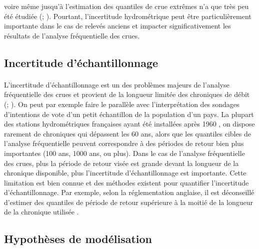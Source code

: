 voire même jusqu'à l'estimation des quantiles de crue extrêmes n'a que très peu été étudiée (\cite{horner_impact_2018}; \cite{steinbakk_propagation_2016}). Pourtant, l'incertitude hydrométrique peut être particulièrement importante dans le cas de relevés anciens et impacter significativement les résultats de l'analyse fréquentielle des crues.
	
	\subsection*{Incertitude d'échantillonnage}
	
	\paragraph{} L'incertitude d'échantillonnage est un des problèmes majeurs de l'analyse fréquentielle des crues et provient de la longueur limitée des chroniques de débit (\cite{apel_flood_2004}; \cite{kjeldsen_uncertainty_2011}). On peut par exemple faire le parallèle avec l'interprétation des sondages d'intentions de vote d'un petit échantillon de la population d'un pays. La plupart des stations hydrométriques françaises ayant été installées après 1960 \citep{le_coz_quantifying_2017}, on dispose rarement de chroniques qui dépassent les 60 ans, alors que les quantiles cibles de l'analyse fréquentielle peuvent correspondre à des périodes de retour bien plus importantes (100 ans, 1000 ans, ou plus). Dans le cas de l'analyse fréquentielle des crues, plus la période de retour visée est grande devant la longueur de la chronique disponible, plus l'incertitude d'échantillonnage est importante. Cette limitation est bien connue et des méthodes existent pour quantifier l'incertitude d'échantillonnage. Par exemple, selon la réglementation anglaise, il est déconseillé d'estimer des quantiles de période de retour supérieure à la moitié de la longueur de la chronique utilisée \citep{whs_flood_2008}.
	
	\subsection*{Hypothèses de modélisation}
	
